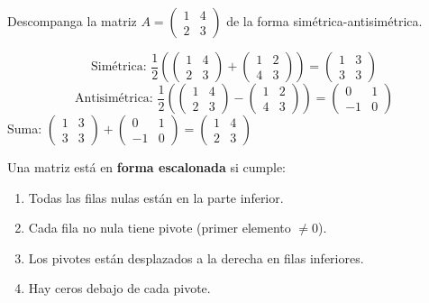 \begin{example} Descompanga la matriz $A = \begin{pmatrix} 1 & 4 \\ 2 & 3 \end{pmatrix}$ de la forma simétrica-antisimétrica.
\begin{myproof}
\[
\text{Simétrica: } \frac{1}{2}\left( \begin{pmatrix} 1 & 4 \\ 2 & 3 \end{pmatrix} + \begin{pmatrix} 1 & 2 \\ 4 & 3 \end{pmatrix} \right) = \begin{pmatrix} 1 & 3 \\ 3 & 3 \end{pmatrix}
\]
\[
\text{Antisimétrica: } \frac{1}{2}\left( \begin{pmatrix} 1 & 4 \\ 2 & 3 \end{pmatrix} - \begin{pmatrix} 1 & 2 \\ 4 & 3 \end{pmatrix} \right) = \begin{pmatrix} 0 & 1 \\ -1 & 0 \end{pmatrix}
\]
Suma: $\begin{pmatrix} 1 & 3 \\ 3 & 3 \end{pmatrix} + \begin{pmatrix} 0 & 1 \\ -1 & 0 \end{pmatrix} = \begin{pmatrix} 1 & 4 \\ 2 & 3 \end{pmatrix}$
\end{myproof}
\end{example}


\begin{definition}\label{def:escalonada}
Una matriz está en \textbf{forma escalonada} si cumple:
\begin{enumerate}
\item Todas las filas nulas están en la parte inferior.
\item Cada fila no nula tiene pivote (primer elemento $\neq 0$).
\item Los pivotes están desplazados a la derecha en filas inferiores.
\item Hay ceros debajo de cada pivote.
\end{enumerate}
\end{definition}

